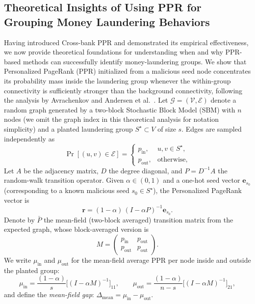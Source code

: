 \documentclass[11pt,english]{article}
\begin{document}
\subsection{Theoretical Insights of Using PPR for Grouping Money Laundering Behaviors}
Having introduced Cross-bank PPR and demonstrated its empirical effectiveness, we now provide theoretical foundations for understanding when and why PPR-based methods can successfully identify money-laundering groups. We show that Personalized PageRank (PPR) initialized from a malicious seed node concentrates its probability mass inside the laundering group whenever the within-group connectivity is sufficiently stronger than the background connectivity, following the analysis by Avrachenkov and Andersen et al.~\parencite{avrachenkov2015pagerank, andersen2006local}. Let $\mathcal{G}=(\mathcal{V},\mathcal{E})$ denote a random graph  generated by a two-block Stochastic Block Model (SBM) with $n$ nodes (we omit the graph index in this theoretical analysis for notation simplicity) and a planted laundering group $S^\star\subset V$ of size $s$. Edges are sampled independently as
\begin{equation}
\Pr[(u,v)\in \mathcal{E}] =
    \begin{cases}
    p_{\mathrm{in}}, & u,v\in S^\star,\\[0.2em]
    p_{\mathrm{out}}, & \text{otherwise},
    \end{cases}
\end{equation}
Let $A$ be the adjacency matrix, $D$ the degree diagonal, and $P=D^{-1}A$ the random-walk transition operator. Given $\alpha\in(0,1)$ and a one-hot seed vector $\mathbf{e}_{s_0}$ (corresponding to a known malicious seed $s_0\in S^\star$), the Personalized PageRank vector is
\begin{equation}
    \mathbf{r} =(1-\alpha)\,(I-\alpha P)^{-1}\mathbf{e}_{s_0}.
\end{equation}
Denote by $\bar P$ the mean-field (two-block averaged) transition matrix from the expected graph, whose block-averaged version is
\begin{equation}
    M =
    \begin{pmatrix}
        p_{\mathrm{in}} & p_{\mathrm{out}}\\
        p_{\mathrm{out}} & p_{\mathrm{out}}
    \end{pmatrix}.
\end{equation}
We write $\mu_{\mathrm{in}}$ and $\mu_{\mathrm{out}}$ for the mean-field average PPR per node inside and outside the planted group:
\begin{equation}
    \label{mu_in_and_out}
    \mu_{\mathrm{in}} =\frac{(1-\alpha)}{s}\big[(I-\alpha M)^{-1}\big]_{11}, \qquad
    \mu_{\mathrm{out}} =\frac{(1-\alpha)}{n-s}\big[(I-\alpha M)^{-1}\big]_{21},
\end{equation}
and define the \emph{mean-field gap}: $\Delta_{\mathrm{mean}}=\mu_{\mathrm{in}}-\mu_{\mathrm{out}}$.
\end{document}
